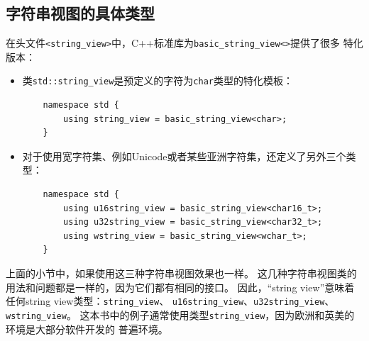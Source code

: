 \subsection{字符串视图的具体类型}
在头文件\texttt{<string\_view>}中，C++标准库为\texttt{basic\_string\_view<>}提供了很多
特化版本：
\begin{itemize}
    \item 类\texttt{std::string\_view}是预定义的字符为\texttt{char}类型的特化模板：
    \begin{lstlisting}
    namespace std {
        using string_view = basic_string_view<char>;
    }
    \end{lstlisting}
    \item 对于使用宽字符集、例如Unicode或者某些亚洲字符集，还定义了另外三个类型：
    \begin{lstlisting}
    namespace std {
        using u16string_view = basic_string_view<char16_t>;
        using u32string_view = basic_string_view<char32_t>;
        using wstring_view = basic_string_view<wchar_t>;
    }
    \end{lstlisting}
\end{itemize}
上面的小节中，如果使用这三种字符串视图效果也一样。
这几种字符串视图类的用法和问题都是一样的，因为它们都有相同的接口。
因此，“string view”意味着任何string view类型：\texttt{string\_view}、
\texttt{u16string\_view}、\texttt{u32string\_view}、\texttt{wstring\_view}。
这本书中的例子通常使用类型\texttt{string\_view}，因为欧洲和英美的环境是大部分软件开发的
普遍环境。


